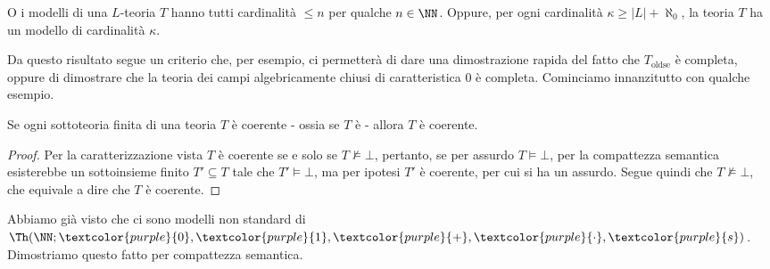 \begin{theorem}
    O i modelli di una $L$-teoria $T$ hanno tutti cardinalità $\leq n$ per qualche $n \in \NN$. Oppure, per ogni cardinalità $\kappa \geq |L| + \aleph_0$, la teoria $T$ ha un modello di cardinalità $\kappa$. 
\end{theorem}

Da questo risultato segue un criterio che, per esempio, ci permetterà di dare una dimostrazione rapida del fatto che $T_{\text{oldse}}$ è completa, oppure di dimostrare che la 
teoria dei campi algebricamente chiusi di caratteristica 0 è completa. Cominciamo innanzitutto con qualche esempio.

\begin{proposition}
    Se ogni sottoteoria finita di una teoria $T$  è coerente - ossia se $T$ è  - allora $T$ è coerente.
\end{proposition}

\begin{proof}
    Per la caratterizzazione vista $T$ è coerente se e solo se $T\not\models \bot$, pertanto, se per assurdo $T \models \bot$, per la compattezza semantica esisterebbe un sottoinsieme finito $T' \subseteq T$ tale che $T' \models \bot$, ma
    per ipotesi $T'$ è coerente, per cui si ha un assurdo. Segue quindi che $T\not\models \bot$, che equivale a dire che $T$ è coerente.
\end{proof}

\begin{example}
    Abbiamo già visto che ci sono modelli non standard di $\Th(\NN;\textcolor{purple}{0},\textcolor{purple}{1},\textcolor{purple}{+},\textcolor{purple}{\cdot},\textcolor{purple}{s})$. Dimostriamo questo fatto per compattezza semantica.
\end{example}


